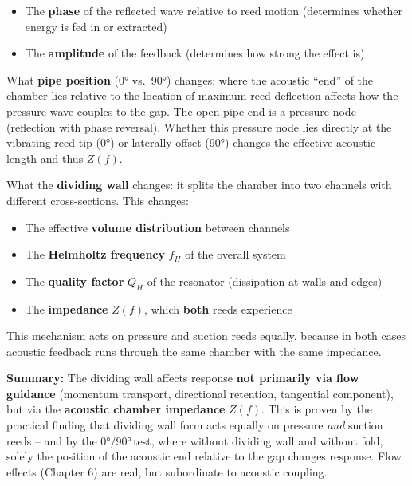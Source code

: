 \documentclass[11pt,a4paper]{article}
\begin{document}
\begin{itemize}[leftmargin=5mm, itemsep=1pt]
\item The \textbf{phase} of the reflected wave relative to reed motion (determines whether energy is fed in or extracted)
\item The \textbf{amplitude} of the feedback (determines how strong the effect is)
\end{itemize}

What \textbf{pipe position} (0° vs.\ 90°) changes: where the acoustic ``end'' of the chamber lies relative to the location of maximum reed deflection affects how the pressure wave couples to the gap. The open pipe end is a pressure node (reflection with phase reversal). Whether this pressure node lies directly at the vibrating reed tip (0°) or laterally offset (90°) changes the effective acoustic length and thus $Z(f)$.

What the \textbf{dividing wall} changes: it splits the chamber into two channels with different cross-sections. This changes:
\begin{itemize}[leftmargin=5mm, itemsep=1pt]
\item The effective \textbf{volume distribution} between channels
\item The \textbf{Helmholtz frequency} $f_H$ of the overall system
\item The \textbf{quality factor} $Q_H$ of the resonator (dissipation at walls and edges)
\item The \textbf{impedance} $Z(f)$, which \textbf{both} reeds experience
\end{itemize}

This mechanism acts on pressure and suction reeds equally, because in both cases acoustic feedback runs through the same chamber with the same impedance.

\begin{keybox}
\textbf{Summary:} The dividing wall affects response \textbf{not primarily via flow guidance} (momentum transport, directional retention, tangential component), but via the \textbf{acoustic chamber impedance} $Z(f)$. This is proven by the practical finding that dividing wall form acts equally on pressure \textit{and} suction reeds -- and by the 0°/90°\,test, where without dividing wall and without fold, solely the position of the acoustic end relative to the gap changes response. Flow effects (Chapter 6) are real, but subordinate to acoustic coupling.
\end{keybox}

\end{document}
